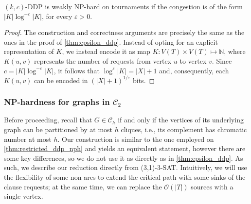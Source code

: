 \documentclass[a4paper,UKenglish,cleveref, autoref, thm-restate]{lipics-v2021}
\renewcommand{\NP}{{\sf NP}\xspace}
\newcommand{\pname}[1]{{\sc #1}}
\newcommand{\bigO}[1]{\mathcal{O}\!\left(#1\right)}
\newcommand{\congestion}{c}
\begin{document}
  \begin{theorem}
    \label{thm:log_ratio_ddp}
    \pname{$(k,c)$-DDP} is weakly \NP-hard on tournaments if
    the congestion is of the form $|K|\log^{-\varepsilon} |K|$, for every $\varepsilon > 0$.
  \end{theorem}

  \begin{proof}
    The construction and correctness arguments are precisely the same as the ones in the
    proof of \autoref{thm:epsilon_ddp}. Instead of opting for an explicit
    representation of $K$, we instead encode it as map $K: V(T) \times V(T) \mapsto
    \mathbb{N}$, where $K(u,v)$ represents the number of requests from vertex $u$ to vertex $v$.
    Since $\congestion = |K|\log^{-\varepsilon} |K|$, it follows that $\log^\varepsilon |K| =
    |X| + 1$ and, consequently, each $K(u,v)$ can be encoded in $(|X| + 1)^{1/\varepsilon}$ bits.
  \end{proof} \subsubsection{\NP-hardness for graphs in $\mathcal{C}_2$}
\label{sec:ch_nph}
Before proceeding, recall that $G \in \mathcal{C}_h$ if and only if the vertices of its underlying graph can be partitioned by at most $h$ cliques, i.e., its complement has chromatic number at most $h$.
Our construction is similar to the one employed on \autoref{thm:restricted_ddp_nph}
and yields an equivalent statement, however there are some key differences, so we
do not use it as directly as in \autoref{thm:epsilon_ddp}.
As such, we describe our reduction directly from \pname{(3,1)-3-SAT}.
Intuitively, we will use the flexibility of some non-arcs to extend the critical path with
some sinks of the clause requests; at the same time, we can replace the $\bigO{|T|}$ sources
with a single vertex.
\end{document}

